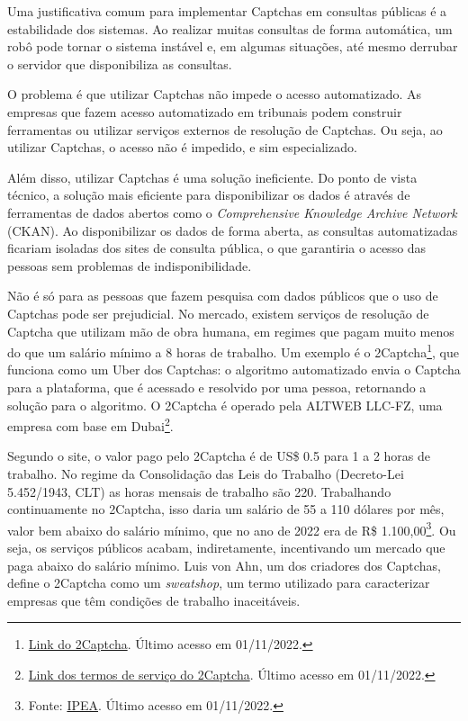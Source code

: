 \documentclass[12pt,twoside,brazilian]{book}
\begin{document}
Uma justificativa comum para implementar Captchas em consultas públicas
é a estabilidade dos sistemas. Ao realizar muitas consultas de forma
automática, um robô pode tornar o sistema instável e, em algumas
situações, até mesmo derrubar o servidor que disponibiliza as consultas.

O problema é que utilizar Captchas não impede o acesso automatizado. As
empresas que fazem acesso automatizado em tribunais podem construir
ferramentas ou utilizar serviços externos de resolução de Captchas. Ou
seja, ao utilizar Captchas, o acesso não é impedido, e sim
especializado.

Além disso, utilizar Captchas é uma solução ineficiente. Do ponto de
vista técnico, a solução mais eficiente para disponibilizar os dados é
através de ferramentas de dados abertos como o \emph{Comprehensive
Knowledge Archive Network} (CKAN). Ao disponibilizar os dados de forma
aberta, as consultas automatizadas ficariam isoladas dos sites de
consulta pública, o que garantiria o acesso das pessoas sem problemas de
indisponibilidade.

Não é só para as pessoas que fazem pesquisa com dados públicos que o uso
de Captchas pode ser prejudicial. No mercado, existem serviços de
resolução de Captcha que utilizam mão de obra humana, em regimes que
pagam muito menos do que um salário mínimo a 8 horas de trabalho. Um
exemplo é o 2Captcha\footnote{\href{https://2captcha.com/make-money-online}{Link
  do 2Captcha}. Último acesso em 01/11/2022.}, que funciona como um Uber
dos Captchas: o algoritmo automatizado envia o Captcha para a
plataforma, que é acessado e resolvido por uma pessoa, retornando a
solução para o algoritmo. O 2Captcha é operado pela ALTWEB LLC-FZ, uma
empresa com base em Dubai\footnote{\href{https://2captcha.com/terms-of-service}{Link
  dos termos de serviço do 2Captcha}. Último acesso em 01/11/2022.}.

Segundo o site, o valor pago pelo 2Captcha é de US\$ 0.5 para 1 a 2
horas de trabalho. No regime da Consolidação das Leis do Trabalho
(Decreto-Lei 5.452/1943, CLT) as horas mensais de trabalho são 220.
Trabalhando continuamente no 2Captcha, isso daria um salário de 55 a 110
dólares por mês, valor bem abaixo do salário mínimo, que no ano de 2022
era de R\$ 1.100,00\footnote{Fonte:
  \href{http://www.ipeadata.gov.br/exibeserie.aspx?stub=1\&serid1739471028=1739471028}{IPEA}.
  Último acesso em 01/11/2022.}. Ou seja, os serviços públicos acabam,
indiretamente, incentivando um mercado que paga abaixo do salário
mínimo. Luis von Ahn, um dos criadores dos Captchas, define o 2Captcha
como um \emph{sweatshop}, um termo utilizado para caracterizar empresas
que têm condições de trabalho inaceitáveis.
\end{document}
